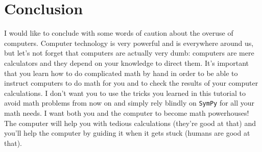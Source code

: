 \documentclass[9pt, onecolumn]{IEEEtran}
\begin{document}
\begin{abstract}
%



\end{abstract}

\begin{spacing}{-1}
\tableofcontents
\end{spacing}









\vspace{-2mm}
\section*{Conclusion}
\label{sec:conclusion}

I would like to conclude with some words of caution about the overuse of computers.
Computer technology is very powerful and is everywhere around us,
but let's not forget that computers are actually very dumb:
computers are mere calculators and they depend on your knowledge to direct them.
It's important that you learn how to do complicated math by hand in order to be 
able to instruct computers to do math for you and to check the results of your computer calculations.
I don't want you to use the tricks you learned in this tutorial to avoid math problems from now on
and simply rely blindly on \texttt{SymPy} for all your math needs.
I want both you and the computer to become math powerhouses!
The computer will help you with tedious calculations (they're good at that)
and you'll help the computer by guiding it when it gets  stuck (humans are good at that).
\end{document}
